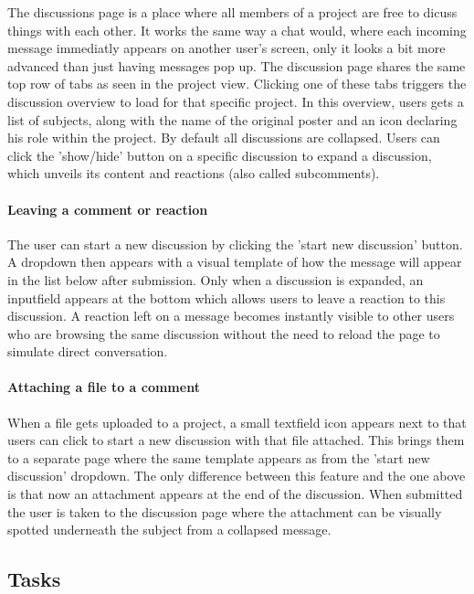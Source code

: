 The discussions page is a place where all members of a project are free to dicuss things with each other. It works the same way a chat would, where
each incoming message immediatly appears on another user's screen, only it looks a bit more advanced than just having messages pop up.
The discussion page shares the same top row of tabs as seen in the project view. Clicking one of these tabs
triggers the discussion overview to load for that specific project. In this overview, users gets a
list of subjects, along with the name of the original poster and an icon declaring his role within the project. 
By default all discussions are collapsed. Users can click the 'show/hide' button on a specific discussion to 
expand a discussion, which unveils its content and reactions (also called subcomments).

\paragraph{Leaving a comment or reaction}

The user can start a new discussion by clicking the 'start new discussion' button. A dropdown 
then appears with a visual template of how the message will appear in the list below after submission.  
Only when a discussion is expanded, an inputfield appears at the bottom which allows users to leave a reaction to this discussion. 
A reaction left on a message becomes instantly visible to other users who are browsing the same discussion without the need to reload the page to simulate direct conversation.

\paragraph{Attaching a file to a comment}

When a file gets uploaded to a project, a small textfield icon appears next to that users can click to start
a new discussion with that file attached. This brings them to a separate page where the same template appears
as from the 'start new discussion' dropdown. The only difference between this feature and the one above is that now an attachment appears at the end of the discussion. 
When submitted the user is taken to the discussion page where the attachment can be visually spotted underneath the subject from a collapsed message.

\subsection*{Tasks}

